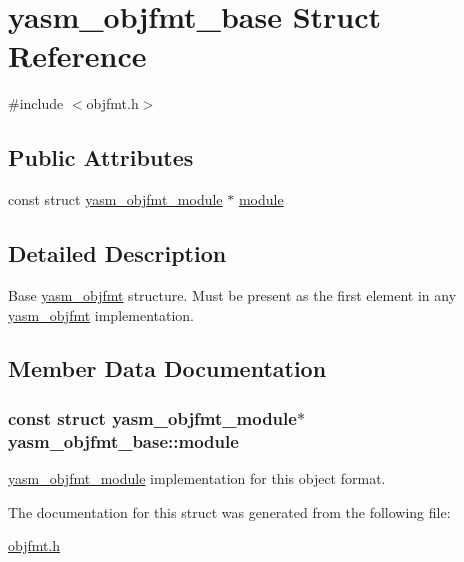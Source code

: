 \hypertarget{structyasm__objfmt__base}{\section{yasm\-\_\-objfmt\-\_\-base Struct Reference}
\label{structyasm__objfmt__base}
}


{\ttfamily \#include $<$objfmt.\-h$>$}

\subsection*{Public Attributes}
\begin{DoxyCompactItemize}
\item 
const struct \hyperlink{structyasm__objfmt__module}{yasm\-\_\-objfmt\-\_\-module} $\ast$ \hyperlink{structyasm__objfmt__base_a98ada6b32a73dee8f37c41f8d3207698}{module}
\end{DoxyCompactItemize}


\subsection{Detailed Description}
Base \hyperlink{coretype_8h_a391681636b57724e337bf97f9832adb7}{yasm\-\_\-objfmt} structure. Must be present as the first element in any \hyperlink{coretype_8h_a391681636b57724e337bf97f9832adb7}{yasm\-\_\-objfmt} implementation. 

\subsection{Member Data Documentation}
\hypertarget{structyasm__objfmt__base_a98ada6b32a73dee8f37c41f8d3207698}{
\subsubsection[{module}]{\setlength{\rightskip}{0pt plus 5cm}const struct {\bf yasm\-\_\-objfmt\-\_\-module}$\ast$ yasm\-\_\-objfmt\-\_\-base\-::module}}\label{structyasm__objfmt__base_a98ada6b32a73dee8f37c41f8d3207698}
\hyperlink{structyasm__objfmt__module}{yasm\-\_\-objfmt\-\_\-module} implementation for this object format. 

The documentation for this struct was generated from the following file\-:\begin{DoxyCompactItemize}
\item 
\hyperlink{objfmt_8h}{objfmt.\-h}\end{DoxyCompactItemize}
